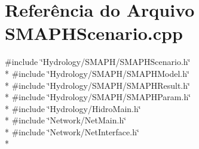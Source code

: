 \section{Referência do Arquivo S\+M\+A\+P\+H\+Scenario.\+cpp}
\label{_s_m_a_p_h_scenario_8cpp}
{\ttfamily \#include \char`\"{}Hydrology/\+S\+M\+A\+P\+H/\+S\+M\+A\+P\+H\+Scenario.\+h\char`\"{}}\\*
{\ttfamily \#include \char`\"{}Hydrology/\+S\+M\+A\+P\+H/\+S\+M\+A\+P\+H\+Model.\+h\char`\"{}}\\*
{\ttfamily \#include \char`\"{}Hydrology/\+S\+M\+A\+P\+H/\+S\+M\+A\+P\+H\+Result.\+h\char`\"{}}\\*
{\ttfamily \#include \char`\"{}Hydrology/\+S\+M\+A\+P\+H/\+S\+M\+A\+P\+H\+Param.\+h\char`\"{}}\\*
{\ttfamily \#include \char`\"{}Hydrology/\+Hidro\+Main.\+h\char`\"{}}\\*
{\ttfamily \#include \char`\"{}Network/\+Net\+Main.\+h\char`\"{}}\\*
{\ttfamily \#include \char`\"{}Network/\+Net\+Interface.\+h\char`\"{}}\\*
